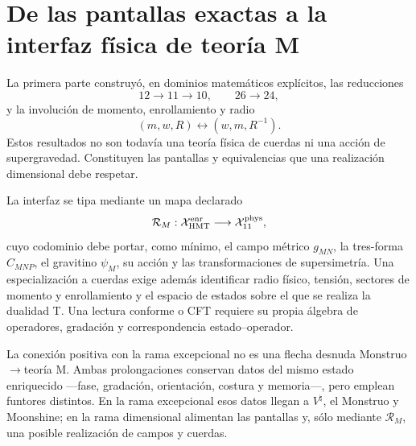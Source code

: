 \section{De las pantallas exactas a la interfaz física de teoría M}
\label{mdp4:sec:interfaz-teoria-m-rev8}

La primera parte construyó, en dominios matemáticos explícitos, las
reducciones
\[
12\longrightarrow11\longrightarrow10,
\qquad
26\longrightarrow24,
\]
y la involución de momento, enrollamiento y radio
\[
(m,w,R)\longleftrightarrow(w,m,R^{-1}).
\]
Estos resultados no son todavía una teoría física de cuerdas ni una acción
de supergravedad. Constituyen las pantallas y equivalencias que una
realización dimensional debe respetar.

La interfaz se tipa mediante un mapa declarado
\[
\mathcal R_M:\mathcal X_{\rm HMT}^{\rm enr}
\longrightarrow
\mathcal X_{11}^{\rm phys},
\]
cuyo codominio debe portar, como mínimo, el campo métrico \(g_{MN}\), la
tres-forma \(C_{MNP}\), el gravitino \(\psi_M\), su acción y las
transformaciones de supersimetría. Una especialización a cuerdas exige
además identificar radio físico, tensión, sectores de momento y
enrollamiento y el espacio de estados sobre el que se realiza la dualidad
T. Una lectura conforme o CFT requiere su propia álgebra de operadores,
gradación y correspondencia estado--operador.

La conexión positiva con la rama excepcional no es una flecha desnuda
Monstruo\(\to\)teoría M. Ambas prolongaciones conservan datos del mismo
estado enriquecido ---fase, gradación, orientación, costura y memoria---,
pero emplean funtores distintos. En la rama excepcional esos datos llegan a
\(V^\natural\), el Monstruo y Moonshine; en la rama dimensional alimentan
las pantallas y, sólo mediante \(\mathcal R_M\), una posible realización de
campos y cuerdas.

